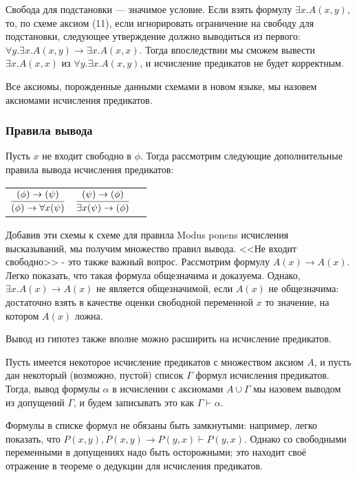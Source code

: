 \documentclass[12pt,a4paper,oneside]{article}
\begin{document}
Свобода для подстановки --- значимое условие. Если взять формулу $\exists x. A(x,y)$, то, по схеме аксиом (11), если игнорировать ограничение на свободу для подстановки, следующее утверждение должно выводиться из первого: 
$\forall y. \exists x. A(x,y) \rightarrow \exists x. A (x,x)$. Тогда впоследствии мы сможем вывести $\exists x. A (x,x)$ из $\forall y. \exists x. A(x,y)$, и исчисление предикатов не будет корректным.

Все аксиомы, порожденные данными схемами в новом языке, мы назовем аксиомами исчисления предикатов.

\subsubsection*{Правила вывода}

Пусть $x$ не входит свободно в $\phi$. Тогда рассмотрим следующие дополнительные
правила вывода исчисления предикатов:

\begin{tabular}{lll}
$\infer{(\phi) \rightarrow \forall{x}(\psi)}{(\phi) \rightarrow (\psi)}$ &
$\infer{\exists{x}(\psi) \rightarrow (\phi)}{(\psi) \rightarrow (\phi)}$
\end{tabular}

Добавив эти схемы к схеме для правила Modus ponens исчисления высказываний,
мы получим множество правил вывода.
<<Не входит свободно>> - это также важный вопрос.
Рассмотрим формулу $A(x) \rightarrow A(x)$. Легко показать, что такая
формула общезначима и доказуема. Однако, $\exists x. A(x) \rightarrow A(x)$
не является общезначимой, если $A(x)$ не общезначима: достаточно взять в качестве оценки свободной переменной $x$ то значение, на котором $A(x)$ ложна.


Вывод из гипотез также вполне можно расширить на исчисление предикатов.
\begin{definition}
Пусть имеется некоторое исчисление предикатов с множеством
аксиом $A$, и пусть дан некоторый (возможно, пустой) список $\Gamma$ 
формул исчисления предикатов. Тогда, вывод формулы $\alpha$
в исчислении с аксиомами $A \cup \Gamma$ мы назовем выводом из 
допущений $\Gamma$, и будем записывать это как $\Gamma \vdash \alpha$.
\end{definition}

Формулы в списке формул не обязаны быть замкнутыми: например, легко 
показать, что $P(x,y), P(x,y)\rightarrow P(y,x) \vdash P(y,x)$. Однако
со свободными переменными в допущениях надо быть осторожными; это 
находит своё отражение в теореме о дедукции для исчисления предикатов.
\end{document}
